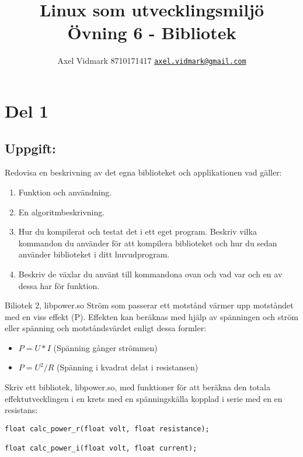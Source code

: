 \documentclass[10pt, a4paper]{article}
\author{Axel Vidmark 8710171417 \href{mailto:axel.vidmark@gmail.com}{\texttt{axel.vidmark@gmail.com}}}
\title{Linux som utvecklingsmiljö \\ Övning 6 - Bibliotek}
\begin{document}
\maketitle


\section*{Del 1}\label{sec:del1}

\subsection*{Uppgift:}
Redovisa en beskrivning av det egna biblioteket och applikationen vad gäller:

\begin{enumerate}

\item Funktion och användning.
\item En algoritmbeskrivning.
\item Hur du kompilerat och testat det i ett eget program. Beskriv vilka kommandon du använder för att kompilera biblioteket och hur du sedan använder biblioteket i ditt huvudprogram.
\item Beskriv de växlar du använt till kommandona ovan och vad var och en av dessa har för funktion.
\end{enumerate}
Biliotek 2, libpower.so
\newline
Ström som passerar ett motstånd värmer upp motståndet med en viss effekt (P). Effekten kan beräknas med hjälp av spänningen och ström eller spänning och motståndsvärdet enligt dessa formler:
\begin{itemize}
\item $P = U * I$  (Spänning gånger strömmen)

\item $P = U^2 / R$ (Spänning i kvadrat delat i resistansen)
\end{itemize}
Skriv ett bibliotek, libpower.so, med funktioner för att beräkna den totala effektutvecklingen i en krets med en spänningskälla kopplad i serie med en en resistans:
\begin{verbatim}
float calc_power_r(float volt, float resistance);

float calc_power_i(float volt, float current);
\end{verbatim}
\end{document}
